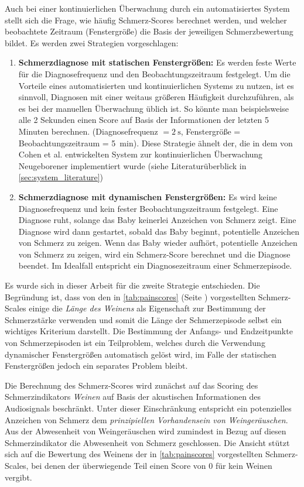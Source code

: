 Auch bei einer kontinuierlichen Überwachung durch ein automatisiertes System stellt sich die Frage, wie häufig Schmerz-Scores berechnet werden, und welcher beobachtete Zeitraum (\glqq Fenstergröße\grqq ) die Basis der jeweiligen Schmerzbewertung bildet. Es werden zwei Strategien vorgeschlagen:
\begin{enumerate}
\item \textbf{Schmerzdiagnose mit statischen Fenstergrößen: } Es werden feste Werte für die Diagnosefrequenz und den Beobachtungszeitraum festgelegt. Um die Vorteile eines automatisierten und kontinuierlichen Systems zu nutzen, ist es sinnvoll, Diagnosen mit einer weitaus größeren Häufigkeit durchzuführen, als es bei der manuellen Überwachung üblich ist. So könnte man beispielsweise alle 2 Sekunden einen Score auf Basis der Informationen der letzten 5 Minuten berechnen. (Diagnosefrequenz $ = \SI{2}{\second}$, Fenstergröße = Beobachtungszeitraum = \SI{5}{\minute}). Diese Strategie ähnelt der, die in dem von Cohen et al. \cite{cohenCry} entwickelten System zur kontinuierlichen Überwachung Neugeborener implementiert wurde (siehe Literaturüberblick in \autoref{sec:system_literature})
\item \textbf{Schmerzdiagnose mit dynamischen Fenstergrößen: } Es wird keine Diagnosefrequenz und kein fester Beobachtungszeitraum festgelegt. Eine Diagnose ruht, solange das Baby keinerlei Anzeichen von Schmerz zeigt. Eine Diagnose wird dann gestartet, sobald das Baby beginnt, potentielle Anzeichen von Schmerz zu zeigen. Wenn das Baby wieder aufhört, potentielle Anzeichen von Schmerz zu zeigen, wird ein Schmerz-Score berechnet und die Diagnose beendet. Im Idealfall entspricht ein Diagnosezeitraum einer Schmerzepisode.
\end{enumerate}

Es wurde sich in dieser Arbeit für die zweite Strategie entschieden. Die Begründung ist, dass von den in \autoref{tab:painscores} (Seite \pageref{tab:painscores}) vorgestellten Schmerz-Scales einige die \emph{Länge des Weinens} als Eigenschaft zur Bestimmung der Schmerzstärke verwenden und somit die Länge der Schmerzepisode selbst ein wichtiges Kriterium darstellt. Die Bestimmung der Anfangs- und Endzeitpunkte von Schmerzepisoden ist ein Teilproblem, welches durch die Verwendung dynamischer Fenstergrößen automatisch gelöst wird, im Falle der statischen Fenstergrößen jedoch ein separates Problem bleibt. 

Die Berechnung des Schmerz-Scores wird zunächst auf das Scoring des Schmerzindikators \emph{Weinen} auf Basis der akustischen Informationen des Audiosignals beschränkt. Unter dieser Einschränkung entspricht ein \glqq potenzielles Anzeichen von Schmerz\grqq{} dem \emph{prinzipiellen Vorhandensein von Weingeräuschen}. Aus der Abwesenheit von Weingeräuschen wird zumindest in Bezug auf diesen Schmerzindikator die Abwesenheit von Schmerz geschlossen. Die Ansicht stützt sich auf die Bewertung des Weinens der in \autoref{tab:painscores} vorgestellten Schmerz-Scales, bei denen der überwiegende Teil einen Score von 0 für \glqq kein Weinen\grqq{} vergibt.

